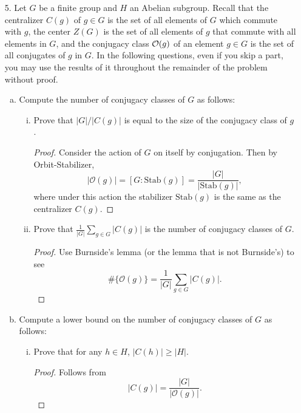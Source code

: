 \begin{itemize}
\begin{enumerate}[(a)]
\begin{proof}
\end{proof}
\end{enumerate}









\item[5.] Let $G$ be a finite group and $H$ an Abelian subgroup. Recall that the centralizer
$C(g)$ of $g \in G$ is the set of all elements of $G$ which commute with $g$, the center
$Z(G)$ is the set of all elements of $g$ that commute with all elements in $G$, and the
conjugacy class $\mathcal{O}(g)$ of an element $g \in G$ is the set of all conjugates of $g$ in $G$.
In the following questions, even if you skip a part, you may use the results of it
throughout the remainder of the problem without proof.
\begin{enumerate}[(a)]
\item Compute the number of conjugacy classes of $G$ as follows:
    \begin{enumerate}[(i)]
        \item Prove that $|G|/|C(g)|$ is equal to the size of the conjugacy class of $g$.
        \begin{proof}
            Consider the action of $G$ on itself by conjugation. Then by Orbit-Stabilizer, $$|\mathcal{O}(g)| = [G : \text{Stab}(g)] = \frac{|G|}{|\text{Stab}(g)|},$$
            where under this action the stabilizer $\text{Stab}(g)$ is the same as the centralizer $C(g)$.
        \end{proof}
        
        \item Prove that $\frac{1}{|G|} \sum_{g \in G} |C(g)|$ is the number of conjugacy classes of $G$.
        \begin{proof}
            Use Burnside's lemma (or the lemma that is not Burnside's) to see 
            $$\#\{\mathcal{O}(g)\} = \frac{1}{|G|} \sum_{g \in G} |C(g)|.$$
        \end{proof}
    \end{enumerate}

\item Compute a lower bound on the number of conjugacy classes of $G$ as follows:
    \begin{enumerate}[(i)]
        \item Prove that for any $h \in H$, $|C(h)| \geq |H|$.
        \begin{proof}
            Follows from $$|C(g)| = \frac{|G|}{|\mathcal{O}(g)|}.$$
        \end{proof}
        

\end{enumerate}
\end{enumerate}
\end{itemize}
